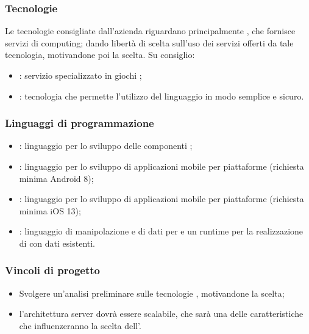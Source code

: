 \documentclass[]{article}
\begin{document}
		\subsubsection{Tecnologie}
		Le tecnologie consigliate dall'azienda riguardano principalmente , che fornisce servizi di  computing; dando libertà di scelta sull'uso dei servizi offerti da tale tecnologia, motivandone poi la scelta.
		Su consiglio:
		\begin{itemize}
			\item {}: servizio specializzato in giochi ;
			\item {}: tecnologia che permette l'utilizzo del linguaggio  in modo semplice e sicuro.

		\end{itemize}

		\subsubsection{Linguaggi di programmazione}
		\begin{itemize}
			\item {}: linguaggio per lo sviluppo delle componenti ;
			\item {}: linguaggio per lo sviluppo di applicazioni mobile per piattaforme  (richiesta minima Android 8);
			\item {}: linguaggio per lo sviluppo di applicazioni mobile per piattaforme (richiesta minima iOS 13);
			\item {}: linguaggio di manipolazione e  di dati  per  e un runtime per la realizzazione di  con dati esistenti.
		\end{itemize}

		\subsubsection{Vincoli di progetto}
		\begin{itemize}
			\item Svolgere un'analisi preliminare sulle tecnologie , motivandone la scelta;
			\item l'architettura server dovrà essere scalabile, che sarà una delle caratteristiche che influenzeranno la scelta dell'.
		\end{itemize}
\end{document}
